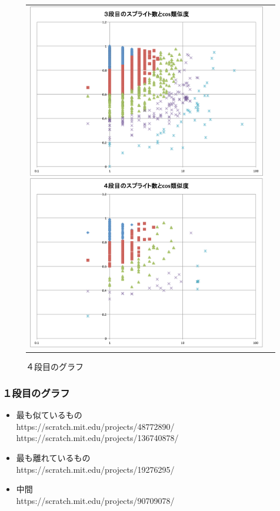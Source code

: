 \documentclass[a4paper,10pt,onecolumn,oneside,openany]{jsbook}
\begin{document}
\begin{figure}[h]
\begin{tabular}{cc}
\begin{minipage}[t]{0.45\hsize}
	 \centering
	 \includegraphics[keepaspectratio, scale = 0.25]{graph_third_splite.pdf}
	 \caption{３段目のグラフ}
	 \label{third_splite}
	\end{minipage}
        \begin{minipage}[t]{0.45\hsize}
	 \centering
	 \includegraphics[keepaspectratio, scale = 0.25]{graph_fourth_splite.pdf}
	 \caption{４段目のグラフ}
	 \label{fourth_splite}
	\end{minipage}
 \end{tabular}
 \end{figure}


 \subsubsection{１段目のグラフ}
\begin{itemize}
\item 最も似ているもの
\\https://scratch.mit.edu/projects/48772890/ 
\\https://scratch.mit.edu/projects/136740878/
\item 最も離れているもの
\\https://scratch.mit.edu/projects/19276295/
\item 中間
\\https://scratch.mit.edu/projects/90709078/
\end{itemize}
\end{document}
